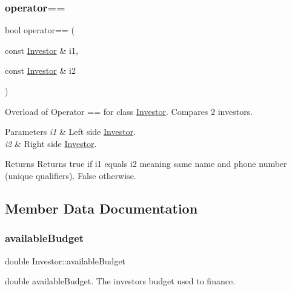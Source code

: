 \subsubsection{\texorpdfstring{operator==}{operator==}}
{\footnotesize\ttfamily bool operator== (\begin{DoxyParamCaption}\item[{const \hyperlink{class_investor}{Investor} \&}]{i1,  }\item[{const \hyperlink{class_investor}{Investor} \&}]{i2 }\end{DoxyParamCaption})\hspace{0.3cm}{\ttfamily [friend]}}

Overload of Operator == for class \hyperlink{class_investor}{Investor}. Compares 2 investor\textquotesingle{}s. 
\begin{DoxyParams}{Parameters}
{\em i1} & Left side \hyperlink{class_investor}{Investor}. \\
\hline
{\em i2} & Right side \hyperlink{class_investor}{Investor}. \\
\hline
\end{DoxyParams}
\begin{DoxyReturn}{Returns}
Returns true if i1 equals i2 meaning same name and phone number (unique qualifiers). False otherwise. 
\end{DoxyReturn}


\subsection{Member Data Documentation}
\mbox{\label{class_investor_a9e1c77689177032764b12761a132ac39}} 
\subsubsection{\texorpdfstring{available\+Budget}{availableBudget}}
{\footnotesize\ttfamily double Investor\+::available\+Budget\hspace{0.3cm}{\ttfamily [private]}}

double available\+Budget. The investor\textquotesingle{}s budget used to finance. \mbox{\label{class_investor_a5d49704cd0e79faf9515f101f1a02b59}} 
